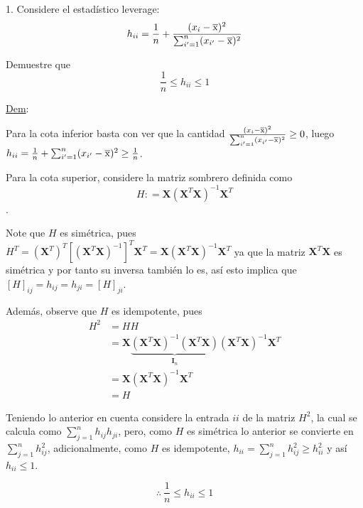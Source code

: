 1. Considere el estadístico leverage:  
$$h_{ii} = \frac{1}{n} + \frac{(x_i - \overline{\rm x})^2}{\sum_{i' = 1}^{n} (x_{i'} - \overline{\rm x})^2}$$

Demuestre que $$\frac{1}{n} \leq h_{ii} \leq 1$$

\underline{Dem}: 

Para la cota inferior basta con ver que la cantidad $\frac{(x_i - \overline{\rm x})^2}{\sum_{i' = 1}^{n} (x_{i'} - \overline{\rm x})^2} \geq 0$, 
luego $h_{ii} = \frac{1}{n} + \sum_{i' = 1}^{n} (x_{i'} - \overline{\rm x})^2 \geq \frac{1}{n}$.

Para la cota superior, considere la matriz sombrero definida como $$H: = \mathbf{X} \left(\mathbf{X}^T \mathbf{X}\right)^{-1} \mathbf{X}^T$$.

Note que $H$ es simétrica, pues $H^T =  (\mathbf{X}^T)^T \left[\left(\mathbf{X}^T \mathbf{X}\right)^{-1} \right]^T \mathbf{X}^T = \mathbf{X} \left(\mathbf{X}^T \mathbf{X}\right)^{-1} \mathbf{X}^T$
ya que la matriz $\mathbf{X}^T \mathbf{X}$ es simétrica y por tanto su inversa también lo es, así esto implica que $[H]_{ij} = h_{ij} = h_{ji} = [H]_{ji}$.

Además, observe que $H$ es idempotente, pues 
\begin{equation*}
	\begin{aligned}
		H^2 &= H H \\
			&= \mathbf{X} \underbrace{\left(\mathbf{X}^T \mathbf{X}\right)^{-1} \left(\mathbf{X}^T \mathbf{X} \right)}_{\mathbf{I}_n} \left(\mathbf{X}^T \mathbf{X}\right)^{-1} \mathbf{X}^T \\
			&= \mathbf{X} \left(\mathbf{X}^T \mathbf{X}\right)^{-1} \mathbf{X}^T \\
			&= H
	\end{aligned}
\end{equation*}


Teniendo lo anterior en cuenta considere la entrada $ii$ de la matriz $H^2$, la cual se calcula como $\sum_{j = 1}^{n} h_{ij} h_{ji}$, pero, como $H$ es simétrica lo anterior
se convierte en $\sum_{j = 1}^{n} h_{ij}^{2}$, adicionalmente, como $H$ es idempotente, $h_{ii} = \sum_{j = 1}^{n} h_{ij}^{2} \geq h_{ii}^{2}$ y así $h_{ii} \leq 1$.

\begin{equation*}
	\therefore \ \frac{1}{n} \leq h_{ii} \leq 1
\end{equation*} 